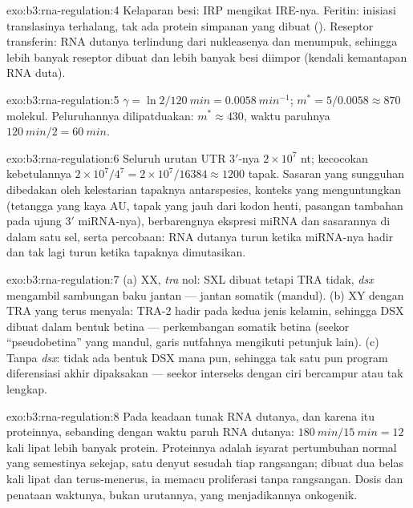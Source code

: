 \begin{solution}{exo:b3:rna-regulation:4}
Kelaparan besi: IRP mengikat IRE-nya. Feritin: inisiasi translasinya
terhalang, tak ada protein simpanan yang dibuat ().
Reseptor transferin: RNA dutanya terlindung dari nukleasenya dan menumpuk,
sehingga lebih banyak reseptor dibuat dan lebih banyak besi diimpor (kendali
kemantapan RNA duta).
\end{solution}

\begin{solution}{exo:b3:rna-regulation:5}
$\gamma = \ln 2/\qty{120}{min} = \qty{0.0058}{min^{-1}}$; $m^{*} =
5/0.0058 \approx 870$ molekul. Peluruhannya dilipatduakan: $m^{*} \approx 430$,
waktu paruhnya $\qty{120}{min}/2 = \qty{60}{min}$.
\end{solution}

\begin{solution}{exo:b3:rna-regulation:6}
Seluruh urutan UTR 3$'$-nya $2\times 10^{7}$ nt; kecocokan kebetulannya $2\times
10^{7}/4^{7} = 2\times 10^{7}/\num{16384} \approx \num{1200}$ tapak.
Sasaran yang sungguhan dibedakan oleh kelestarian tapaknya antarspesies,
konteks yang menguntungkan (tetangga yang kaya AU, tapak yang jauh dari
kodon henti, pasangan tambahan pada ujung 3$'$ miRNA-nya), berbarengnya
ekspresi miRNA dan sasarannya di dalam satu sel, serta percobaan: RNA dutanya
turun ketika miRNA-nya hadir dan tak lagi turun ketika tapaknya dimutasikan.
\end{solution}

\begin{solution}{exo:b3:rna-regulation:7}
(a) XX, \emph{tra} nol: SXL dibuat tetapi TRA tidak, \emph{dsx} mengambil
sambungan baku jantan --- jantan somatik (mandul). (b) XY dengan TRA yang
terus menyala: TRA-2 hadir pada kedua jenis kelamin, sehingga DSX dibuat dalam
bentuk betina --- perkembangan somatik betina (seekor
``pseudobetina'' yang mandul, garis nutfahnya mengikuti petunjuk lain). (c)
Tanpa \emph{dsx}: tidak ada bentuk DSX mana pun, sehingga tak satu pun
program diferensiasi akhir dipaksakan --- seekor interseks dengan ciri
bercampur atau tak lengkap.
\end{solution}

\begin{solution}{exo:b3:rna-regulation:8}
Pada keadaan tunak RNA dutanya, dan karena itu proteinnya, sebanding
dengan waktu paruh RNA dutanya: $\qty{180}{min}/\qty{15}{min} = 12$ kali
lipat lebih banyak protein. Proteinnya adalah isyarat pertumbuhan normal yang
semestinya sekejap, satu denyut sesudah tiap rangsangan; dibuat dua belas kali
lipat dan terus-menerus, ia memacu proliferasi tanpa rangsangan. Dosis dan
penataan waktunya, bukan urutannya, yang menjadikannya onkogenik.
\end{solution}

